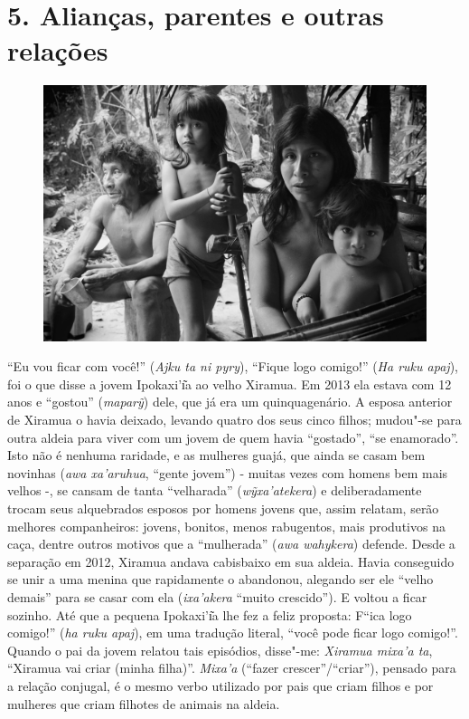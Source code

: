 
\chapter{5. Alianças, parentes e outras relações}\label{alianuxe7as-parentes-e-outras-relauxe7uxf5es}

\begin{figure}[H]
\centering
  \includegraphics[width=\textwidth]{./imgs/IMG_4928}
\end{figure}

\noindent ``Eu vou ficar com você!'' (\emph{Ajku ta ni pyry}), ``Fique logo comigo!''
(\emph{Ha ruku apaj}), foi o que disse a jovem Ipokaxi'ı͂a ao velho
Xiramua. Em 2013 ela estava com 12 anos e ``gostou'' (\emph{maparỹ}) dele,
que já era um quinquagenário. A esposa anterior de Xiramua o havia
deixado, levando quatro dos seus cinco filhos; mudou"-se para outra
aldeia para viver com um jovem de quem havia ``gostado'', ``se enamorado''.
Isto não é nenhuma raridade, e as mulheres guajá, que ainda se casam bem
novinhas (\emph{awa xa'aruhua}, ``gente jovem'') - muitas vezes com homens
bem mais velhos -, se cansam de tanta ``velharada'' (\emph{wỹxa'atekera})
e deliberadamente trocam seus alquebrados esposos por homens jovens que,
assim relatam, serão melhores companheiros: jovens, bonitos, menos
rabugentos, mais produtivos na caça, dentre outros motivos que a
``mulherada'' (\emph{awa wahykera}) defende. Desde a separação em 2012,
Xiramua andava cabisbaixo em sua aldeia. Havia conseguido se unir a uma
menina que rapidamente o abandonou, alegando ser ele ``velho demais'' para
se casar com ela (\emph{ixa'akera} ``muito crescido''). E voltou a ficar
sozinho. Até que a pequena Ipokaxi'ı͂a lhe fez a feliz proposta: F``ica
logo comigo!'' (\emph{ha ruku apaj}), em uma tradução literal, ``você pode
ficar logo comigo!''. Quando o pai da jovem relatou tais episódios,
disse"-me: \emph{Xiramua mixa'a ta}, ``Xiramua vai criar (minha filha)''.
\emph{Mixa'a} (``fazer crescer''/``criar''), pensado para a relação
conjugal, é o mesmo verbo utilizado por pais que criam filhos e por
mulheres que criam filhotes de animais na aldeia.


